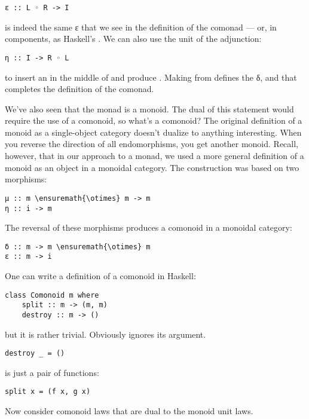 \begin{verbatim}
ε :: L ◦ R -> I
\end{verbatim}
is indeed the same ε that we see in the definition of the comonad ---
or, in components, as Haskell's . We can also use the
unit of the adjunction:

\begin{verbatim}
η :: I -> R ◦ L
\end{verbatim}
to insert an  in the middle of  and
produce . Making  from 
defines the δ, and that completes the definition of the comonad.

We've also seen that the monad is a monoid. The dual of this statement
would require the use of a comonoid, so what's a comonoid? The original
definition of a monoid as a single-object category doesn't dualize to
anything interesting. When you reverse the direction of all
endomorphisms, you get another monoid. Recall, however, that in our
approach to a monad, we used a more general definition of a monoid as an
object in a monoidal category. The construction was based on two
morphisms:

\begin{Verbatim}[commandchars=\\\{\}]
μ :: m \ensuremath{\otimes} m -> m
η :: i -> m
\end{Verbatim}
The reversal of these morphisms produces a comonoid in a monoidal
category:

\begin{Verbatim}[commandchars=\\\{\}]
δ :: m -> m \ensuremath{\otimes} m
ε :: m -> i
\end{Verbatim}
One can write a definition of a comonoid in Haskell:

\begin{verbatim}
class Comonoid m where
    split :: m -> (m, m)
    destroy :: m -> ()
\end{verbatim}
but it is rather trivial. Obviously  ignores its
argument.

\begin{verbatim}
destroy _ = ()
\end{verbatim}
 is just a pair of functions:

\begin{verbatim}
split x = (f x, g x)
\end{verbatim}
Now consider comonoid laws that are dual to the monoid unit laws.

